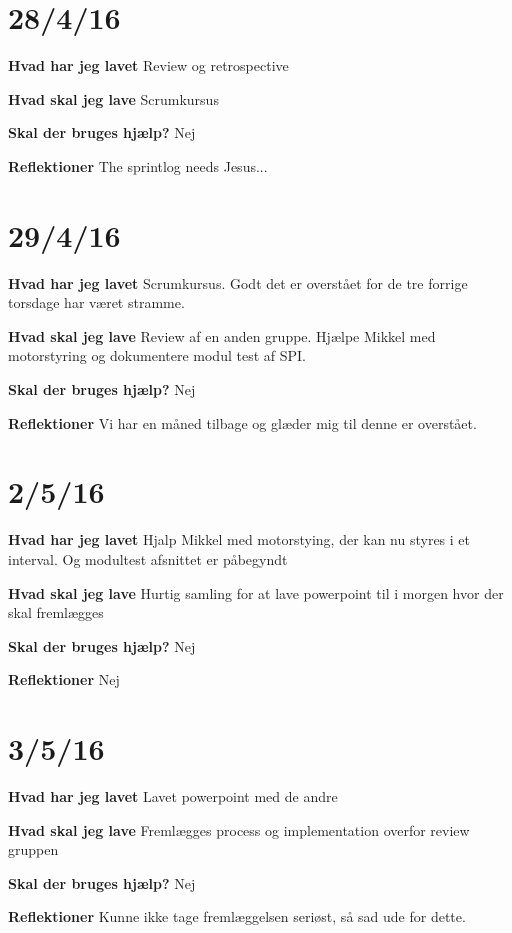 \documentclass{article}
\begin{document}
	\section{28/4/16}
	\textbf{Hvad har jeg lavet}
	Review og retrospective
	
	\textbf{Hvad skal jeg lave}
	Scrumkursus
	
	\textbf{Skal der bruges hjælp?}
	Nej
	
	
	\textbf{Reflektioner}
	The sprintlog needs Jesus...
	
	\section{29/4/16}
	\textbf{Hvad har jeg lavet}
	Scrumkursus. Godt det er overstået for de tre forrige torsdage har været stramme.
	
	\textbf{Hvad skal jeg lave}
	Review af en anden gruppe. Hjælpe Mikkel med motorstyring og dokumentere modul test af SPI.
	
	\textbf{Skal der bruges hjælp?}
	Nej
	
	
	\textbf{Reflektioner}
	Vi har en måned tilbage og glæder mig til denne er overstået.
	
	\section{2/5/16}
	\textbf{Hvad har jeg lavet}
	Hjalp Mikkel med motorstying, der kan nu styres i et interval. Og modultest afsnittet er påbegyndt
	
	\textbf{Hvad skal jeg lave}
	Hurtig samling for at lave powerpoint til i morgen hvor der skal fremlægges
	
	\textbf{Skal der bruges hjælp?}
	Nej
	
	
	\textbf{Reflektioner}
	Nej
	
	\section{3/5/16}
	\textbf{Hvad har jeg lavet}
	Lavet powerpoint med de andre
	
	\textbf{Hvad skal jeg lave}
	Fremlægges process og implementation overfor review gruppen
	
	\textbf{Skal der bruges hjælp?}
	Nej
	
	
	\textbf{Reflektioner}
	Kunne ikke tage fremlæggelsen seriøst, så sad ude for dette. 
\end{document}
